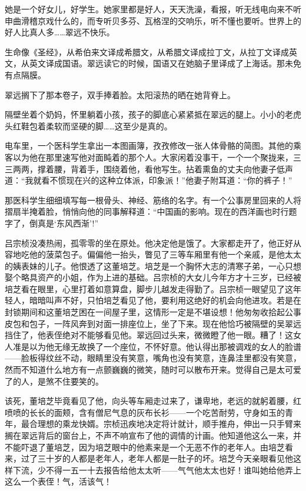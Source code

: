 \par 她是一个好女儿，好学生。她家里都是好人，天天洗澡，看报，听无线电向来不听申曲滑稽京戏什么的，而专听贝多芬、瓦格涅的交响乐，听不懂也要听。世界上的好人比真人多……翠远不快乐。
\par 生命像《圣经》，从希伯来文译成希腊文，从希腊文译成拉丁文，从拉丁文译成英文，从英文译成国语。翠远读它的时候，国语又在她脑子里译成了上海话。那未免有点隔膜。
\par 翠远搁下了那本卷子，双手捧着脸。太阳滚热的晒在她背脊上。
\par 隔壁坐着个奶妈，怀里躺着小孩，孩子的脚底心紧紧抵在翠远的腿上。小小的老虎头红鞋包着柔软而坚硬的脚……这至少是真的。
\par 电车里，一个医科学生拿出一本图画簿，孜孜修改一张人体骨骼的简图。其他的乘客以为他在那里速写他对面盹着的那个人。大家闲着没事干，一个一个聚拢来，三三两两，撑着腰，背着手，围绕着他，看他写生。拈着熏鱼的丈夫向他妻子低声道：“我就看不惯现在兴的这种立体派，印象派！”他妻子附耳道：“你的裤子！”
\par 那医科学生细细填写每一根骨头、神经、筋络的名字。有一个公事房里回来的人将摺扇半掩着脸，悄悄向他的同事解释道：“中国画的影响。现在的西洋画也时行题字了，倒真是‘东风西渐’!”
\par 吕宗桢没凑热闹，孤零零的坐在原处。他决定他是饿了。大家都走开了，他正好从容地吃他的菠菜包子。偏偏他一抬头，瞥见了三等车厢里有他一个亲戚，是他太太的姨表妹的儿子。他恨透了这董培芝。培芝是一个胸怀大志的清寒子弟，一心只想娶个略具资产的小姐，作为上进的基础。吕宗桢的大女儿今年方才十三岁，已经被培芝看在眼里，心里打着如意算盘，脚步儿越发走得勤了。吕宗桢一眼望见了这年轻人，暗暗叫声不好，只怕培芝看见了他，要利用这绝好的机会向他进攻。若是在封锁期间和这董培芝困在一间屋子里，这情形一定是不堪设想！他匆匆收拾起公事皮包和包子，一阵风奔到对面一排座位上，坐了下来。现在他恰巧被隔壁的吴翠远挡住了，他表侄绝对不能够看见他。翠远回过头来，微微瞪了他一眼。糟了！这女人准是以为他无缘无故换了一个座位，不怀好意。他认得出那被调戏的女人的脸谱——脸板得纹丝不动，眼睛里没有笑意，嘴角也没有笑意，连鼻洼里都没有笑意，然而不知道什么地方有一点颤巍巍的微笑，随时可以散布开来。觉得自己是太可爱了的人，是煞不住要笑的。
\par 该死，董培芝毕竟看见了他，向头等车厢走过来了，谦卑地，老远的就躬着腰，红喷喷的长长的面颊，含有僧尼气息的灰布长衫——一个吃苦耐劳，守身如玉的青年，最合理想的乘龙快婿。宗桢迅疾地决定将计就计，顺手推舟，伸出一只手臂来搁在翠远背后的窗台上，不声不响宣布了他的调情的计画。他知道他这么一来，并不能吓退了董培芝，因为培芝眼中的他素来是一个无恶不作的老年人。由培芝看来，过了三十岁的人都是老年人，老年人都是一肚子的坏。培芝今天亲眼看见他这样下流，少不得一五一十去报告给他太太听——气气他太太也好！谁叫她给他弄上这么一个表侄！气，活该气！
